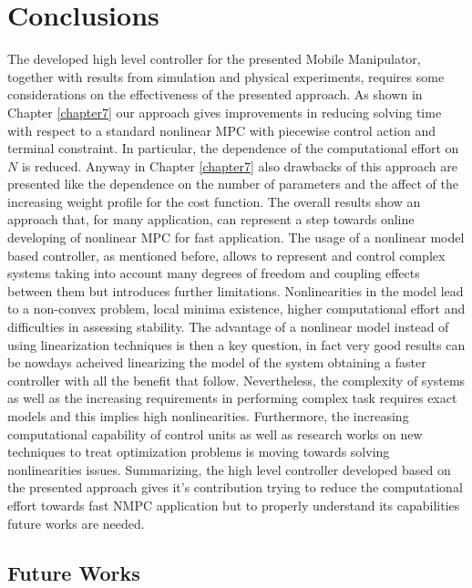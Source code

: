
\chapter{Conclusions}
\label{conclusions}

The developed high level controller for the presented Mobile Manipulator, together with results from simulation and physical experiments, requires some considerations on the effectiveness of the presented approach. As shown in Chapter \ref{chapter7} our approach gives improvements in reducing solving time with respect to a standard nonlinear MPC with piecewise control action and terminal constraint. In particular, the dependence of the computational effort on $N$ is reduced. Anyway in Chapter \ref{chapter7} also drawbacks of this approach are presented like the dependence on the number of parameters and the affect of the increasing weight profile for the cost function. The overall results show an approach that, for many application, can represent a step towards online developing of nonlinear MPC for fast application. The usage of a nonlinear model based controller, as mentioned before, allows to represent and control complex systems taking into account many degrees of freedom and coupling effects between them but introduces further limitations. Nonlinearities in the model lead to a non-convex problem, local minima existence, higher computational effort and difficulties in assessing stability. The advantage of a nonlinear model instead of using linearization techniques is then a key question, in fact very good results can be nowdays acheived linearizing the model of the system obtaining a faster controller with all the benefit that follow. Nevertheless, the complexity of systems as well as the increasing requirements in performing complex task requires exact models and this implies high nonlinearities. Furthermore, the increasing computational capability of control units as well as research works on new techniques to treat optimization problems is moving towards solving nonlinearities issues. Summarizing, the high level controller developed based on the presented approach gives it's contribution trying to reduce the computational effort towards fast NMPC application but to properly understand its capabilities future works are needed.

\section{Future Works}

